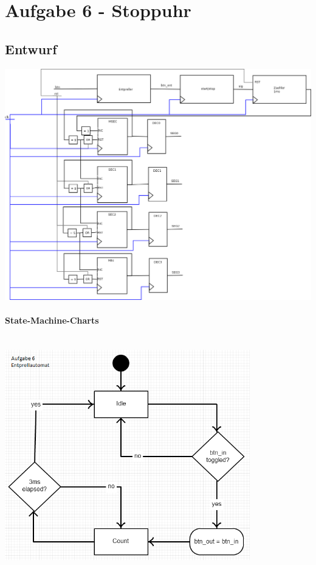 \section{Aufgabe 6 - Stoppuhr}
\subsection{Entwurf}
\includegraphics[width=1\textwidth]{resources/06-stopuhr.png}
	\newpage
	\paragraph{State-Machine-Charts}\hfill \\

		\includegraphics[width=0.8\textwidth]{resources/06-Entprellautomat.png}
		

